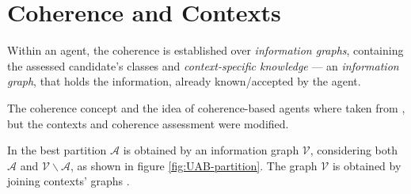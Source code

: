 





%

\def\coh{\mathrm{coh}}
\def\cohi{\mathrm{\widetilde{coh}}}


\section{Coherence and Contexts}
\label{section:coherence}


Within an agent, the coherence is established over \emph{information graphs},
containing the assessed candidate's classes and \emph{context-specific
  knowledge} --- an \emph{information graph}, that holds the information,
already known/accepted by the agent.

The coherence concept and the idea of coherence-based agents
where taken from \cite{UAB-Thesis}, but the contexts and
coherence assessment were modified.

In \cite{UAB-Thesis} the best partition $\mathcal{A}$ 
is obtained by an information graph $\mathcal{V}$, considering both
$\mathcal{A}$ and $\mathcal{V} \backslash \mathcal{A}$, as shown in figure
\ref{fig:UAB-partition}. The graph $\mathcal{V}$ is obtained by joining
contexts' graphs \cite[62]{UAB-Thesis}.

